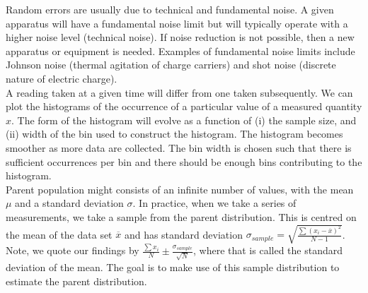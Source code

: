 \documentclass[a4paper]{article}
\begin{document}
\begin{Note}
Random errors are usually due to technical and fundamental noise. A given apparatus will have a fundamental noise limit but will typically operate with a higher noise level (technical noise). If noise reduction is not possible, then a new apparatus or equipment is needed. Examples of fundamental noise limits include Johnson noise (thermal agitation of charge carriers) and shot noise (discrete nature of electric charge).\\[5pt]
A reading taken at a given time will differ from one taken subsequently. We can plot the histograms of the occurrence of a particular value of a measured quantity $x$. The form of the histogram will evolve as a function of (i) the sample size, and (ii) width of the bin used to construct the histogram. The histogram becomes smoother as more data are collected. The bin width is chosen such that there is sufficient occurrences per bin and there should be enough bins contributing to the histogram.\\[5pt]
Parent population might consists of an infinite number of values, with the mean $\mu$ and a standard deviation $\sigma$. In practice, when we take a series of measurements, we take a sample from the parent distribution. This is centred on the mean of the data set $\overline{x}$ and has standard deviation $\sigma_{sample}=\sqrt{\frac{\sum(x_i-\overline{x})^2}{N-1}}$. Note, we quote our findings by $\frac{\sum x_i}{N}\pm\frac{\sigma_{sample}}{\sqrt{N}}$, where that is called the standard deviation of the mean. The goal is to make use of this sample distribution to estimate the parent distribution.
\end{Note}
\end{document}
